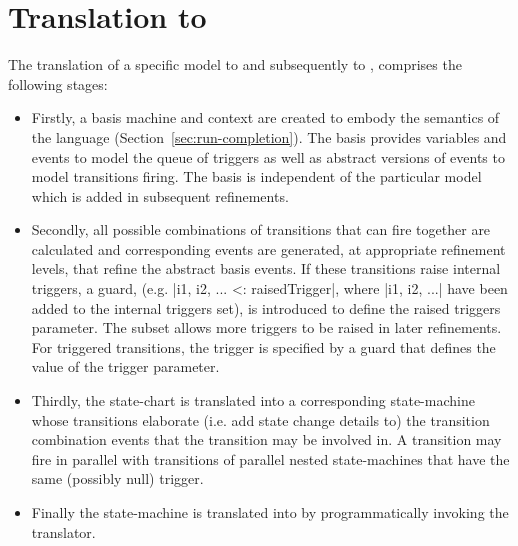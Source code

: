 
\section{\SCXML Translation to \EventB}
\label{sec:translation}

The translation of a specific \SCXML model to \UMLB and subsequently to \EventB, comprises the following stages: 
\begin{itemize}
	\item 
Firstly, a basis machine and context are created to embody the semantics of the \SCXML language (Section~\ref{sec:run-completion}).
The basis provides variables and events to model the queue of triggers as well as abstract versions of events to model transitions firing.
The basis is independent of the particular \SCXML model which is added in subsequent refinements.
	\item 
Secondly, all possible combinations of transitions that can fire together are calculated and corresponding events are generated, at appropriate refinement levels, that refine the abstract basis events.  
If these transitions raise internal triggers, a guard, (e.g. |{i1, i2, ...} <: raisedTrigger|, where |i1, i2, ...| have been added to the internal triggers set), is introduced to define the raised triggers parameter. 
The subset allows more triggers to be raised in later refinements.
For triggered transitions, the trigger is specified by a guard that defines the value of the trigger parameter. 
	\item 
Thirdly, the \SCXML state-chart is translated into a corresponding \UMLB state-machine whose transitions elaborate (i.e. add state change details to) the transition combination events that the transition may be involved in.
A transition may fire in parallel with transitions of parallel nested state-machines that have the same (possibly null) trigger.
	\item
Finally the \UMLB state-machine is translated into \EVENTB by programmatically invoking the \UMLB translator.
\end{itemize}


